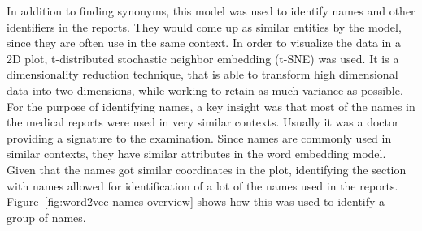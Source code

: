 In addition to finding synonyms, this model was used to identify names and other identifiers in the reports.
They would come up as similar entities by the model, since they are often use in the same context.
In order to visualize the data in a 2D plot, t-distributed stochastic neighbor embedding (t-SNE) was used.
It is a dimensionality reduction technique, that is able to transform high dimensional data into two dimensions, while working to retain as much variance as possible.
For the purpose of identifying names, a key insight was that most of the names in the medical reports were used in very similar contexts.
Usually it was a doctor providing a signature to the examination.
Since names are commonly used in similar contexts, they have similar attributes in the word embedding model.
Given that the names got similar coordinates in the plot, identifying the section with names allowed for identification of a lot of the names used in the reports.
Figure~\ref{fig:word2vec-names-overview} shows how this was used to identify a group of names.

